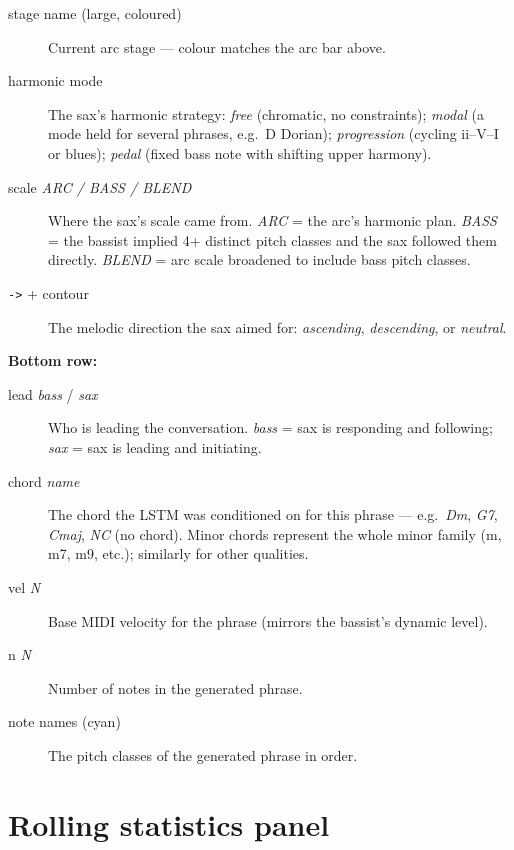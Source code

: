 \documentclass[10pt,a4paper]{article}
\newcommand{\val}[1]{\textit{#1}}
\begin{document}
\vspace{2pt}
\begin{description}
  \item[stage name (large, coloured)]
    Current arc stage --- colour matches the arc bar above.
  \item[harmonic mode]
    The sax's harmonic strategy: \val{free} (chromatic, no constraints);
    \val{modal} (a mode held for several phrases, e.g.\ D Dorian);
    \val{progression} (cycling ii--V--I or blues);
    \val{pedal} (fixed bass note with shifting upper harmony).
  \item[scale \val{ARC / BASS / BLEND}]
    Where the sax's scale came from.
    \val{ARC} = the arc's harmonic plan.
    \val{BASS} = the bassist implied 4+ distinct pitch classes and the sax
    followed them directly.
    \val{BLEND} = arc scale broadened to include bass pitch classes.
  \item[\texttt{->} + contour]
    The melodic direction the sax aimed for: \val{ascending},
    \val{descending}, or \val{neutral}.
\end{description}

\vspace{6pt}
\noindent\textbf{Bottom row:}

\vspace{2pt}
\begin{description}
  \item[lead \val{bass} / \val{sax}]
    Who is leading the conversation.
    \val{bass} = sax is responding and following;
    \val{sax} = sax is leading and initiating.
  \item[chord \val{name}]
    The chord the LSTM was conditioned on for this phrase ---
    e.g.\ \val{Dm}, \val{G7}, \val{Cmaj}, \val{NC} (no chord).
    Minor chords represent the whole minor family (m, m7, m9, etc.);
    similarly for other qualities.
  \item[vel \val{N}]
    Base MIDI velocity for the phrase (mirrors the bassist's dynamic level).
  \item[n \val{N}]
    Number of notes in the generated phrase.
  \item[note names (cyan)]
    The pitch classes of the generated phrase in order.
\end{description}

\section{Rolling statistics panel}
\end{document}
